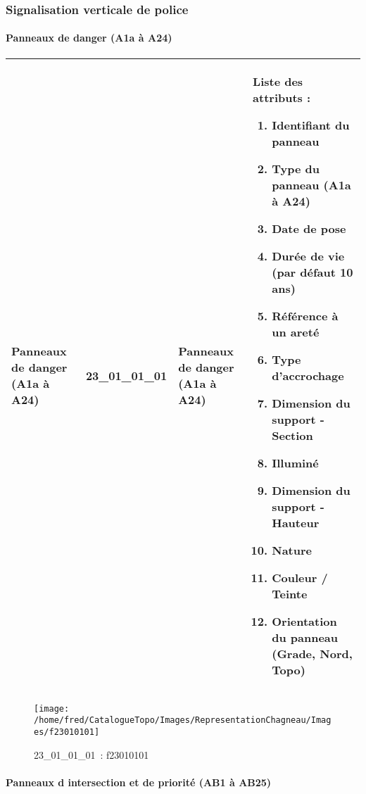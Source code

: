\documentclass[12pt,titlepage]{book}
\begin{document}
\subsubsection{\large Signalisation verticale de police}
\paragraph{Panneaux de danger (A1a à A24)}
\noindent
\vspace{\baselineskip}

\renewcommand{\arraystretch}{1.2}
\begin{supertabular}{|p{10cm}|c|p{13cm}|p{12cm}|}
 Panneaux de danger (A1a à A24) & 23\_01\_01\_01 & Panneaux de danger (A1a à A24) & Liste des attributs :
\begin{enumerate}
  \item Identifiant du panneau  \item Type du panneau (A1a à A24)  \item Date de pose  \item Durée de vie (par défaut 10 ans)  \item Référence à un areté  \item Type d'accrochage  \item Dimension du support - Section  \item Illuminé  \item Dimension du support - Hauteur  \item Nature  \item Couleur / Teinte  \item Orientation du panneau (Grade, Nord, Topo)\end{enumerate}
\\
\hline
\end{supertabular}
\begin{figure}[h!]
  \hfill         %
  \begin{minipage}[t]{3cm}
    \begin{center}
      \texttt{[image: /home/fred/CatalogueTopo/Images/RepresentationChagneau/Images/f23010101]}
      \caption[~23\_01\_01\_01]{\small{23\_01\_01\_01~:} \tiny{f23010101}}\label{f23010101}
    \end{center}
  \end{minipage}
\end{figure}


\paragraph{Panneaux d intersection et de priorité (AB1 à AB25)}
\noindent
\vspace{\baselineskip}
\end{document}
